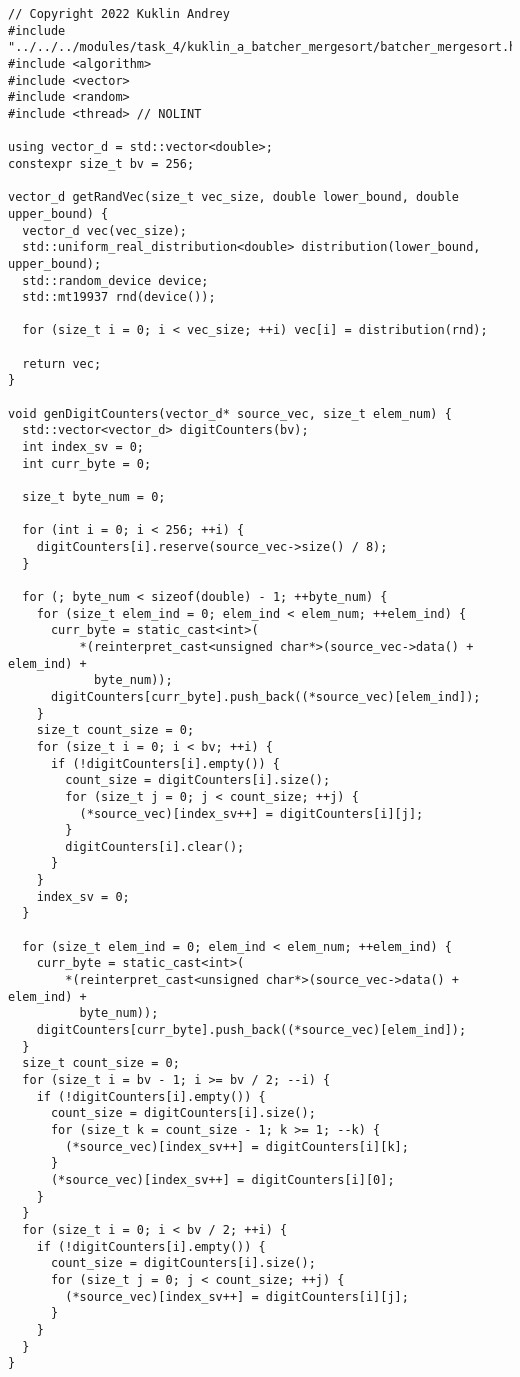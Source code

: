 \documentclass{report}
\begin{document}
\begin{lstlisting}
// Copyright 2022 Kuklin Andrey
#include "../../../modules/task_4/kuklin_a_batcher_mergesort/batcher_mergesort.h"
#include <algorithm>
#include <vector>
#include <random>
#include <thread> // NOLINT

using vector_d = std::vector<double>;
constexpr size_t bv = 256;

vector_d getRandVec(size_t vec_size, double lower_bound, double upper_bound) {
  vector_d vec(vec_size);
  std::uniform_real_distribution<double> distribution(lower_bound, upper_bound);
  std::random_device device;
  std::mt19937 rnd(device());

  for (size_t i = 0; i < vec_size; ++i) vec[i] = distribution(rnd);

  return vec;
}

void genDigitCounters(vector_d* source_vec, size_t elem_num) {
  std::vector<vector_d> digitCounters(bv);
  int index_sv = 0;
  int curr_byte = 0;

  size_t byte_num = 0;

  for (int i = 0; i < 256; ++i) {
    digitCounters[i].reserve(source_vec->size() / 8);
  }

  for (; byte_num < sizeof(double) - 1; ++byte_num) {
    for (size_t elem_ind = 0; elem_ind < elem_num; ++elem_ind) {
      curr_byte = static_cast<int>(
          *(reinterpret_cast<unsigned char*>(source_vec->data() + elem_ind) +
            byte_num));
      digitCounters[curr_byte].push_back((*source_vec)[elem_ind]);
    }
    size_t count_size = 0;
    for (size_t i = 0; i < bv; ++i) {
      if (!digitCounters[i].empty()) {
        count_size = digitCounters[i].size();
        for (size_t j = 0; j < count_size; ++j) {
          (*source_vec)[index_sv++] = digitCounters[i][j];
        }
        digitCounters[i].clear();
      }
    }
    index_sv = 0;
  }

  for (size_t elem_ind = 0; elem_ind < elem_num; ++elem_ind) {
    curr_byte = static_cast<int>(
        *(reinterpret_cast<unsigned char*>(source_vec->data() + elem_ind) +
          byte_num));
    digitCounters[curr_byte].push_back((*source_vec)[elem_ind]);
  }
  size_t count_size = 0;
  for (size_t i = bv - 1; i >= bv / 2; --i) {
    if (!digitCounters[i].empty()) {
      count_size = digitCounters[i].size();
      for (size_t k = count_size - 1; k >= 1; --k) {
        (*source_vec)[index_sv++] = digitCounters[i][k];
      }
      (*source_vec)[index_sv++] = digitCounters[i][0];
    }
  }
  for (size_t i = 0; i < bv / 2; ++i) {
    if (!digitCounters[i].empty()) {
      count_size = digitCounters[i].size();
      for (size_t j = 0; j < count_size; ++j) {
        (*source_vec)[index_sv++] = digitCounters[i][j];
      }
    }
  }
}


\end{lstlisting}
\end{document}
